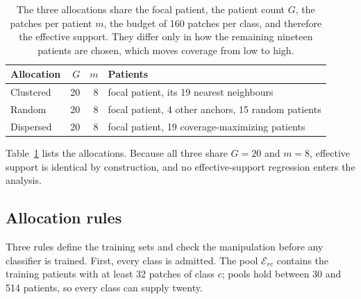 \documentclass[11pt]{article}
\begin{document}
\begin{table}[htbp]
\centering
\renewcommand{\arraystretch}{1.15}
\begin{tabular}{@{}lrrl@{}}
\toprule
Allocation & $G$ & $m$ & Patients \\
\midrule
Clustered & 20 & 8 & focal patient, its 19 nearest neighbours \\
Random & 20 & 8 & focal patient, 4 other anchors, 15 random patients \\
Dispersed & 20 & 8 & focal patient, 19 coverage-maximizing patients \\
\bottomrule
\end{tabular}
\caption{The three allocations share the focal patient, the patient count $G$, the patches per patient $m$, the budget of 160 patches per class, and therefore the effective support. They differ only in how the remaining nineteen patients are chosen, which moves coverage from low to high.}
\label{tab:allocations}
\end{table}

\noindent Table~\ref{tab:allocations} lists the allocations. Because all three share $G=20$ and $m=8$, effective support is identical by construction, and no effective-support regression enters the analysis.

\subsection{Allocation rules}
\label{sec:allocation}
Three rules define the training sets and check the manipulation before any classifier is trained. First, every class is admitted. The pool $\mathcal E_{rc}$ contains the training patients with at least 32 patches of class $c$; pools hold between 30 and 514 patients, so every class can supply twenty.
\end{document}
